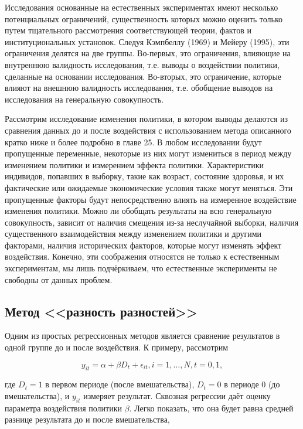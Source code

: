 Исследования основанные на естественных экспериментах имеют несколько потенциальных ограничений, существенность которых  можно оценить только путем тщательного рассмотрения соответствующей теории, фактов и институциональных установок. Следуя Кэмпбеллу (1969) и Мейеру (1995), эти ограничения делятся на две группы. Во-первых, это ограничения, влияющие на внутреннюю валидность исследования, т.е. выводы о воздействии политики, сделанные на основании исследования. Во-вторых, это ограничение, которые влияют на внешнюю валидность исследования, т.е. обобщение выводов на исследования на генеральную совокупность.


Рассмотрим исследование изменения политики, в котором  выводы делаются из сравнения данных до и после воздействия с использованием метода описанного кратко ниже и более подробно в главе 25. В любом исследовании будут пропущенные переменные, некоторые из них  могут  измениться в период между  изменением политики и измерением эффекта политики. 
Характеристики индивидов, попавших в выборку, такие как возраст, состояние здоровья, и их фактические или ожидаемые экономические условия также могут меняться. 
Эти пропущенные факторы будут непосредственно влиять на измеренное воздействие изменения политики. Можно ли обобщать  результаты на всю генеральную совокупность, зависит от наличия смещения из-за неслучайной выборки, наличия существенного  взаимодействия между изменением политики и другими факторами, наличия исторических факторов, которые могут изменять эффект воздействия. 
Конечно, эти соображения относятся не только к естественным экспериментам, мы лишь подчёркиваем, что естественные эксперименты не свободны от данных проблем.


\subsection{Метод <<разность  разностей>>}



Одним из простых регрессионных методов является сравнение результатов в одной группе до и после воздействия. К примеру, рассмотрим

\[
y_{it}=\alpha+\beta D_{t} +\epsilon_{it}, i=1, \dots, N, t=0,1,
\]

где $D_{t}=1$ в первом периоде (после вмешательства), $D_{t}=0$ в периоде 0 (до вмешательства), и $y_{it}$ измеряет результат. Сквозная регрессии даёт оценку параметра воздействия политики  $\beta$. Легко показать, что она будет равна  средней разнице результата до и после вмешательства,


